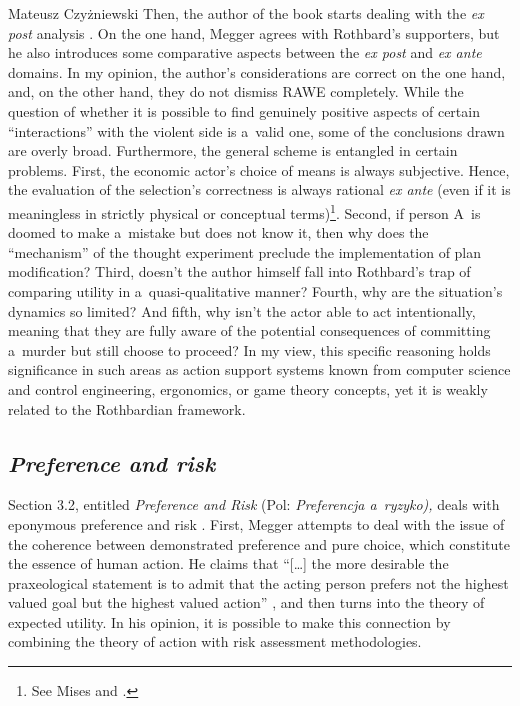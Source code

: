 \begin{newrevengenv}{Mateusz Czyżniewski}
Then, the author of the book starts dealing with the \textit{ex post} analysis 
\parencite[][pp.70–72]{megger_sprawiedliwosc_2021}. %
 On the one hand, Megger agrees with Rothbard's supporters, but he also introduces some comparative aspects between the \textit{ex post} and \textit{ex ante} domains. In my opinion, the author's considerations are correct on the one hand, and, on the other hand, they do not dismiss RAWE completely. While the question of whether it is possible to find genuinely positive aspects of certain ``interactions'' with the violent side is a~valid one, some of the conclusions drawn are overly broad. Furthermore, the general scheme is entangled in certain problems. First, the economic actor's choice of means is always subjective. Hence, the evaluation of the selection's correctness is always rational \textit{ex ante} (even if it is meaningless in strictly physical or conceptual terms)\footnote{See Mises 
\parencite[pp.13–23][]{mises_human_1998} %
 and 
\parencite[pp.264–271][]{mises_theory_1997}.%
}. Second, if person A~is doomed to make a~mistake but does not know it, then why does the ``mechanism'' of the thought experiment preclude the implementation of plan modification? Third, doesn't the author himself fall into Rothbard's trap of comparing utility in a~quasi-qualitative manner? Fourth, why are the situation's dynamics so limited? And fifth, why isn't the actor able to act intentionally, meaning that they are fully aware of the potential consequences of committing a~murder but still choose to proceed? In my view, this specific reasoning holds significance in such areas as action support systems known from computer science and control engineering, ergonomics, or game theory concepts, yet it is weakly related to the Rothbardian framework.



\subsection{\itshape Preference and risk}



Section 3.2, entitled \textit{Preference and Risk} (Pol: \textit{Preferencja a~ryzyko),} deals with eponymous preference and risk 
\parencite[][pp.73–82]{megger_sprawiedliwosc_2021}. %
 First, Megger attempts to deal with the issue of the coherence between demonstrated preference and pure choice, which constitute the essence of human action. He claims that ``[…] the more desirable the praxeological statement is to admit that the acting person prefers not the highest valued goal but the highest valued action'' 
\parencite[][p.74]{megger_sprawiedliwosc_2021}, %
 and then turns into the theory of expected utility. In his opinion, it is possible to make this connection by combining the theory of action with risk assessment methodologies.




\end{newrevengenv}
